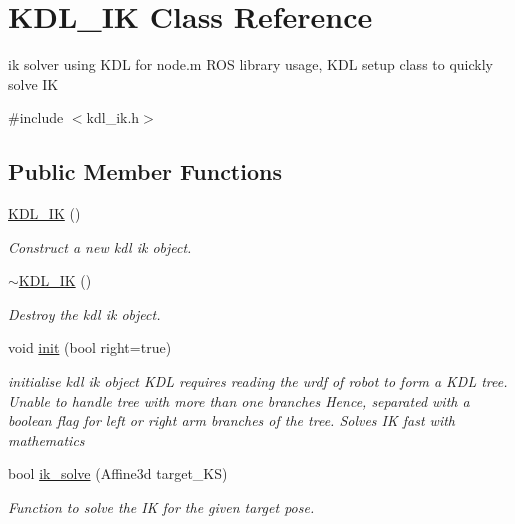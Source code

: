 \hypertarget{classKDL__IK}{}\section{K\+D\+L\+\_\+\+IK Class Reference}
\label{classKDL__IK}


ik solver using K\+DL for node.\+m R\+OS library usage, K\+DL setup class to quickly solve IK  




{\ttfamily \#include $<$kdl\+\_\+ik.\+h$>$}

\subsection*{Public Member Functions}
\begin{DoxyCompactItemize}
\item 
\mbox{\label{classKDL__IK_ab5bc497a769ea4b1fb2b121c2d26a895}} 
\hyperlink{classKDL__IK_ab5bc497a769ea4b1fb2b121c2d26a895}{K\+D\+L\+\_\+\+IK} ()
\begin{DoxyCompactList}\small\item\em Construct a new kdl ik object. \end{DoxyCompactList}\item 
\mbox{\label{classKDL__IK_a3e2e2ebd42a8689c5761adbf04414e54}} 
\hyperlink{classKDL__IK_a3e2e2ebd42a8689c5761adbf04414e54}{$\sim$\+K\+D\+L\+\_\+\+IK} ()
\begin{DoxyCompactList}\small\item\em Destroy the kdl ik object. \end{DoxyCompactList}\item 
void \hyperlink{classKDL__IK_aa7fb5139673aaa0c24620c51fad7e1d6}{init} (bool right=true)
\begin{DoxyCompactList}\small\item\em initialise kdl ik object K\+DL requires reading the urdf of robot to form a K\+DL tree. Unable to handle tree with more than one branches Hence, separated with a boolean flag for left or right arm branches of the tree. Solves IK fast with mathematics \end{DoxyCompactList}\item 
bool \hyperlink{classKDL__IK_ac5840ffc7f30fd303ab5454d02456c54}{ik\+\_\+solve} (Affine3d target\+\_\+\+KS)
\begin{DoxyCompactList}\small\item\em Function to solve the IK for the given target pose. \end{DoxyCompactList}\item 

\end{DoxyCompactItemize}
